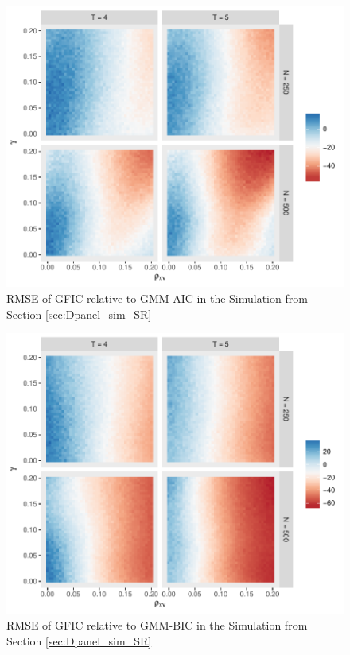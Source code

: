 \begin{figure}
\centering
\includegraphics[scale = 0.8]{./simulations/DynamicPanel/results/Dpanel_GFIC_RMSE_rel_AIC}
\caption{RMSE of GFIC relative to GMM-AIC in the Simulation from Section \ref{sec:Dpanel_sim_SR}}
\end{figure}
\begin{figure}
\centering
\includegraphics[scale = 0.8]{./simulations/DynamicPanel/results/Dpanel_GFIC_RMSE_rel_BIC}
\caption{RMSE of GFIC relative to GMM-BIC in the Simulation from Section \ref{sec:Dpanel_sim_SR}}
\end{figure}
